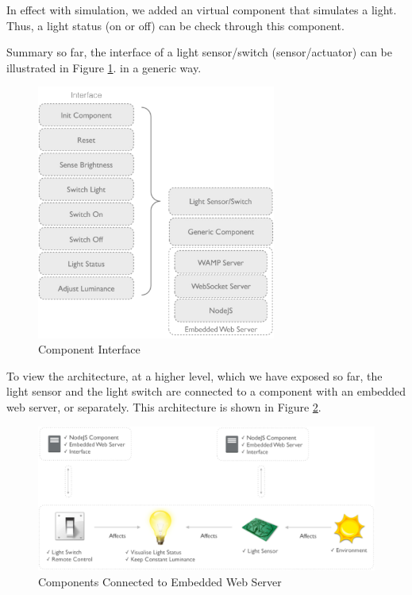 In effect with simulation, we added an virtual component that simulates a light. Thus, a light status (on or off) can be check through this component. 

Summary so far, the interface of a light sensor/switch (sensor/actuator) can be illustrated in Figure \ref{fig:component-interface}. in a generic way.

\begin{figure}[ht]
  \begin{center}
    \includegraphics[width=0.7\textwidth]{images/component-interface.pdf}
    \caption{Component Interface}
    \label{fig:component-interface}
  \end{center}
\end{figure}

To view the architecture, at a higher level, which we have exposed so far, the light sensor and the light switch are connected to a component with an embedded web server, or separately. This architecture is shown in Figure \ref{fig:component-nodeJS-interface}.

\begin{figure}[ht]
  \begin{center}
    \includegraphics[width=1\textwidth]{images/component-nodeJS-interface.pdf}
    \caption{Components Connected to Embedded Web Server}
    \label{fig:component-nodeJS-interface}
  \end{center}
\end{figure}

